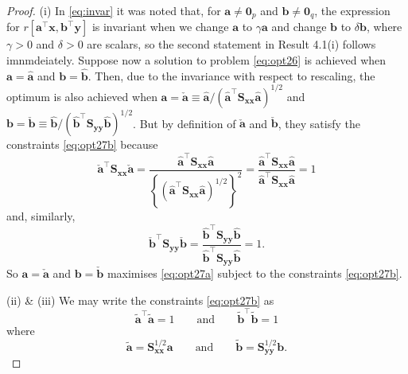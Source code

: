 \documentclass[]{book}
\theoremstyle{definition}
\theoremstyle{definition}
\theoremstyle{definition}
\theoremstyle{remark}
\begin{document}
\begin{proof}
{}(i) In \eqref{eq:invar} it was noted that, for \(\boldsymbol a\neq {\mathbf 0}_p\) and \(\boldsymbol b\neq {\mathbf 0}_q\), the expression for \(r[\boldsymbol a^\top \boldsymbol x, \boldsymbol b^\top \boldsymbol y]\) is invariant when we change \(\boldsymbol a\) to \(\gamma \boldsymbol a\) and change \(\boldsymbol b\) to \(\delta \boldsymbol b\), where \(\gamma>0\) and \(\delta>0\) are scalars, so the second statement in Result 4.1(i) follows imnmdeiately. Suppose now a solution to problem \eqref{eq:opt26} is achieved when \(\boldsymbol a= \hat{\boldsymbol a}\) and \(\boldsymbol b=\hat{\boldsymbol b}\). Then, due to the invariance with respect to rescaling, the optimum is also achieved when \(\boldsymbol a=\check{\boldsymbol a}\equiv\hat{\boldsymbol a}/(\hat{\boldsymbol a}^\top \boldsymbol S_{\boldsymbol x\boldsymbol x} \hat{\boldsymbol a})^{1/2}\) and \(\boldsymbol b=\check{\boldsymbol b}\equiv \hat{\boldsymbol b}/(\hat{\boldsymbol b}^\top \boldsymbol S_{\boldsymbol y\boldsymbol y} \hat{\boldsymbol b})^{1/2}\). But by definition of \(\check{\boldsymbol a}\) and \(\check{\boldsymbol b}\), they satisfy the constraints \eqref{eq:opt27b} because
\[
\check{\boldsymbol a}^\top \boldsymbol S_{\boldsymbol x\boldsymbol x} \check{\boldsymbol a}=\frac{\hat{\boldsymbol a}^\top \boldsymbol S_{\boldsymbol x\boldsymbol x}\hat{\boldsymbol a}}{\left \{ \left (\hat{\boldsymbol a}^\top \boldsymbol S_{\boldsymbol x\boldsymbol x}\hat{\boldsymbol a}\right )^{1/2}\right \}^2}
=\frac{\hat{\boldsymbol a}^\top \boldsymbol S_{\boldsymbol x\boldsymbol x}\hat{\boldsymbol a}}{\hat{\boldsymbol a}^\top \boldsymbol S_{\boldsymbol x\boldsymbol x}\hat{\boldsymbol a}}=1
\]
and, similarly,
\[
\check{\boldsymbol b}^\top \boldsymbol S_{\boldsymbol y\boldsymbol y} \check{\boldsymbol b}=\frac{\hat{\boldsymbol b}^\top \boldsymbol S_{\boldsymbol y\boldsymbol y}\hat{\boldsymbol b}}{\hat{\boldsymbol b}^\top \boldsymbol S_{\boldsymbol y\boldsymbol y}\hat{\boldsymbol b}}=1.
\]
So \(\boldsymbol a=\check{\boldsymbol a}\) and \(\boldsymbol b=\check{\boldsymbol b}\) maximises \eqref{eq:opt27a} subject to the constraints \eqref{eq:opt27b}.

\noindent (ii) \& (iii) We may write the constraints \eqref{eq:opt27b} as
\[
\tilde{\boldsymbol a}^\top \tilde{\boldsymbol a}=1 \qquad \text{and} \qquad \tilde{\boldsymbol b}^\top \tilde{\boldsymbol b}=1
\]
where
\[
\tilde{\boldsymbol a}=\boldsymbol S_{\boldsymbol x\boldsymbol x}^{1/2} \boldsymbol a\qquad \text{and} \qquad \tilde{\boldsymbol b}=\boldsymbol S_{\boldsymbol y\boldsymbol y}^{1/2}\boldsymbol b.
\]


\end{proof}
\end{document}

